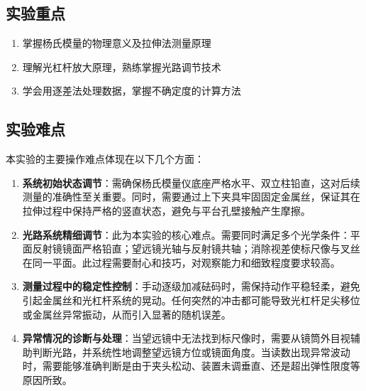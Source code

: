 \documentclass[]{../../templates/Report}%
\begin{document}
\subsection{实验重点}
\begin{enumerate}
\item 掌握杨氏模量的物理意义及拉伸法测量原理
\item 理解光杠杆放大原理，熟练掌握光路调节技术
\item 学会用逐差法处理数据，掌握不确定度的计算方法
\end{enumerate}

\subsection{实验难点}
本实验的主要操作难点体现在以下几个方面：

\begin{enumerate}
\item \textbf{系统初始状态调节}：需确保杨氏模量仪底座严格水平、双立柱铅直，这对后续测量的准确性至关重要。同时，需要通过上下夹具牢固固定金属丝，保证其在拉伸过程中保持严格的竖直状态，避免与平台孔壁接触产生摩擦。

\item \textbf{光路系统精细调节}：此为本实验的核心难点。需要同时满足多个光学条件：平面反射镜镜面严格铅直；望远镜光轴与反射镜共轴；消除视差使标尺像与叉丝在同一平面。此过程需要耐心和技巧，对观察能力和细致程度要求较高。

\item \textbf{测量过程中的稳定性控制}：手动逐级加减砝码时，需保持动作平稳轻柔，避免引起金属丝和光杠杆系统的晃动。任何突然的冲击都可能导致光杠杆足尖移位或金属丝异常振动，从而引入显著的随机误差。

\item \textbf{异常情况的诊断与处理}：当望远镜中无法找到标尺像时，需要从镜筒外目视辅助判断光路，并系统性地调整望远镜方位或镜面角度。当读数出现异常波动时，需要能够准确判断是由于夹头松动、装置未调垂直、还是超出弹性限度等原因所致。
\end{enumerate}
\end{document}
